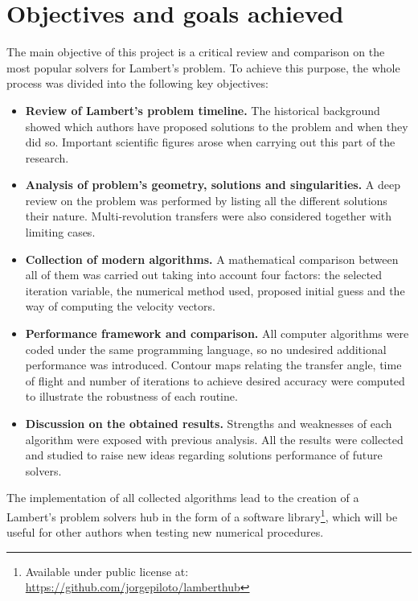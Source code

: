 \section{Objectives and goals achieved}

The main objective of this project is a critical review and comparison on the
most popular solvers for Lambert's problem. To achieve this purpose, the
whole process was divided into the following key objectives:

\begin{itemize}

  \item \textbf{Review of Lambert's problem timeline.}
        The historical background showed which authors have proposed solutions
        to the problem and when they did so. Important scientific
        figures arose when carrying out this part of the research.

  \item \textbf{Analysis of problem's geometry, solutions and singularities.}
        A deep review on the problem was performed by listing all the
        different solutions their nature.  Multi-revolution transfers were also
        considered together with limiting cases.

  \item \textbf{Collection of modern algorithms.}
        A mathematical comparison between all of them was carried out taking
        into account four factors: the selected iteration variable, the
        numerical method used, proposed initial guess and the way of
        computing the velocity vectors.


  \item \textbf{Performance framework and comparison.}
        All computer algorithms were coded under the same programming language,
        so no undesired additional performance was introduced.  Contour
        maps relating the transfer angle, time of flight and number of
        iterations to achieve desired accuracy were computed to
        illustrate the robustness of each routine.

  \item \textbf{Discussion on the obtained results.}
        Strengths and weaknesses of each algorithm were exposed with previous
        analysis. All the results were collected and studied to raise
        new ideas regarding solutions performance of future solvers.

\end{itemize}

The implementation of all collected algorithms lead to the creation of a
Lambert's problem solvers hub in the form of a software
library\footnote{Available under public license at:
\href{https://github.com/jorgepiloto/lamberthub}{https://github.com/jorgepiloto/lamberthub}},
which will be useful for other authors when testing new numerical procedures.
